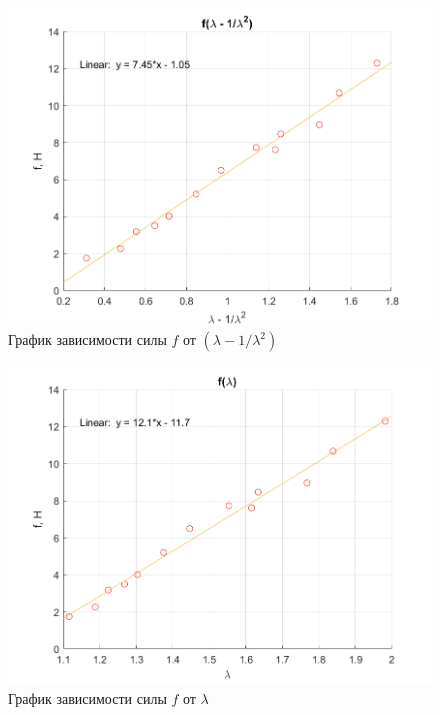 \documentclass[a4paper,11.5pt]{article} %
\begin{document}
\begin{figure}[h]
    \centering
    \includegraphics[scale=0.75]{graph1.png}
    \caption{График зависимости силы $f$ от $(\lambda - 1/\lambda^2)$}
    \label{fig:vac2}
\end{figure}

\begin{figure}[h]
    \centering
    \includegraphics[scale=0.75]{graph_spec.png}
    \caption{График зависимости силы $f$ от $\lambda$}
    \label{fig:vac25}
\end{figure}
\end{document}
